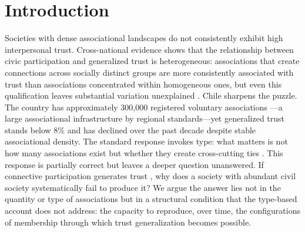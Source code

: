 \hspace{10pt}

\newpage

\section{Introduction}

Societies with dense associational landscapes do not consistently exhibit high interpersonal trust. Cross-national evidence shows that the relationship between civic participation and generalized trust is heterogeneous: associations that create connections across socially distinct groups are more consistently associated with trust than associations concentrated within homogeneous ones, but even this qualification leaves substantial variation unexplained \parencite{paxton_social_2002, paxton_association_2007, stolle1998all}. Chile sharpens the puzzle. The country has approximately 300,000 registered voluntary associations \parencite{irarrazaval_chile_2017}---a large associational infrastructure by regional standards---yet generalized trust stands below 8\% and has declined over the past decade despite stable associational density. The standard response invokes type: what matters is not how many associations exist but whether they create cross-cutting ties \parencite{putnam_bowling_2000, coleman_social_1988}. This response is partially correct but leaves a deeper question unanswered. If connective participation generates trust \parencite{paxton_association_2007}, why does a society with abundant civil society systematically fail to produce it? We argue the answer lies not in the quantity or type of associations but in a structural condition that the type-based account does not address: the capacity to reproduce, over time, the configurations of membership through which trust generalization becomes possible.

